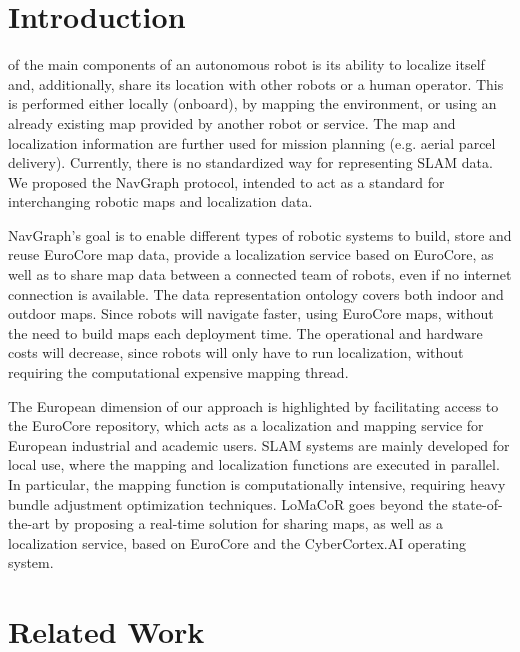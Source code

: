 \documentclass[journal]{IEEEtran}
\begin{document}
\section{Introduction}
\label{sec:introduction}

  of the main components of an autonomous robot is its ability to localize itself and, additionally, share its location with other robots or a human operator. This is performed either locally (onboard), by mapping the environment, or using an already existing map provided by another robot or service. The map and localization information are further used for mission planning (e.g. aerial parcel delivery). Currently, there is no standardized way for representing SLAM data. We proposed the NavGraph protocol, intended to act as a standard for interchanging robotic maps and localization data.

NavGraph's goal is to enable different types of robotic systems to build, store and reuse EuroCore map data, provide a localization service based on EuroCore, as well as to share map data between a connected team of robots, even if no internet connection is available. The data representation ontology covers both indoor and outdoor maps. Since robots will navigate faster, using EuroCore maps, without the need to build maps each deployment time. The operational and hardware costs will decrease, since robots will only have to run localization, without requiring the computational expensive mapping thread.

The European dimension of our approach is highlighted by facilitating access to the EuroCore repository, which acts as a localization and mapping service for European industrial and academic users. SLAM systems are mainly developed for local use, where the mapping and localization functions are executed in parallel. In particular, the mapping function is computationally intensive, requiring heavy bundle adjustment optimization techniques. LoMaCoR goes beyond the state-of-the-art by proposing a real-time solution for sharing maps, as well as a localization service, based on EuroCore and the CyberCortex.AI operating system.




\section{Related Work}
\label{sec:related_work}



\cite{ogc_geopose_2023}
\cite{ogc_indoorgml_2020}
\cite{CCM_SLAM_2019}
\cite{COVINS_2021}
\cite{HU2025117531}
\cite{8934466}
\cite{RDC_SLAM_2022}
\cite{feng2024s3e}
\cite{slam_share_2022}
\cite{10918818}
\end{document}
